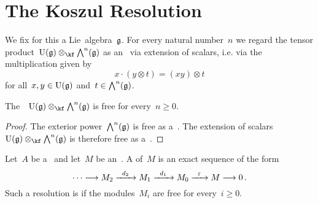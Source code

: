 \section{The Koszul Resolution}
\label{koszul resolution}


\begin{convention}
	We fix for this  a Lie~algebra~$\mathfrak{g}$.
	For every natural number~$n$ we regard the tensor product~$\Univ(\glie) \otimes_{\kf} \Exterior^n(\glie)$ as an~\module{$\Univ(\glie)$} via extension of scalars, i.e. via the multiplication given by
	\[
		x \cdot (y \otimes t)
		=
		(xy) \otimes t
	\]
	for all~$x, y \in \operatorname{U}(\mathfrak{g})$ and~$t \in \operatorname{\bigwedge}^n(\mathfrak{g})$.
\end{convention}


\begin{lemma}
	\label{extension of scalars is free}
	The~\module{$\Univ(\glie)$}~$\Univ(\glie) \otimes_{\kf} \Exterior^n(\glie)$ is free for every~$n \geq 0$.
\end{lemma}


\begin{proof}
	The exterior power~$\operatorname{\bigwedge}^n(\mathfrak{g})$ is free as a~\module{$\kf$}.
	The extension of scalars~$\Univ(\glie) \otimes_{\kf} \Exterior^n(\glie)$ is therefore free as a~\module{$\Univ(\glie)$}.
\end{proof}


\begin{recall}
	Let~$A$ be a~\algebra{$\kf$} and let~$M$ be an~.
	A  of~$M$ is an exact sequence of the form
	\[
		\dotsb
		\to
		M_2
		\xto{d_2}
		M_1
		\xto{d_1}
		M_0
		\xto{\varepsilon}
		M
		\to
		0 \,.
	\]
	Such a resolution is  if the modules~$M_i$ are free for every~$i \geq 0$.
\end{recall}


